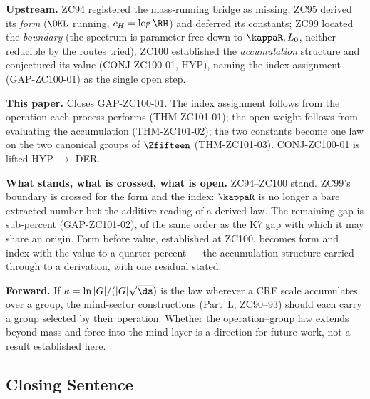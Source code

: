 \documentclass[12pt, a4paper]{article}
\begin{document}
\begin{genealogybox}[title={How ZC101 Sits in the Corpus}]
\textbf{Upstream.} ZC94 registered the mass-running bridge as missing; ZC95
derived its \emph{form} ($\DKL$ running, $c_H=\log\RH$) and deferred its
constants; ZC99 located the \emph{boundary} (the spectrum is parameter-free down
to $\kappaR,L_0$, neither reducible by the routes tried); ZC100 established the
\emph{accumulation} structure and conjectured its value (CONJ-ZC100-01, HYP),
naming the index assignment (GAP-ZC100-01) as the single open step.

\textbf{This paper.} Closes GAP-ZC100-01. The index assignment follows from the
operation each process performs (THM-ZC101-01); the open weight follows from
evaluating the accumulation (THM-ZC101-02); the two constants become one law on
the two canonical groups of $\Zfifteen$ (THM-ZC101-03). CONJ-ZC100-01 is lifted
HYP $\to$ DER.

\textbf{What stands, what is crossed, what is open.} ZC94--ZC100 stand. ZC99's
boundary is crossed for the form and the index: $\kappaR$ is no longer a bare
extracted number but the additive reading of a derived law. The remaining gap is
sub-percent (GAP-ZC101-02), of the same order as the K7 gap with which it may
share an origin. Form before value, established at ZC100, becomes form and index
with the value to a quarter percent --- the accumulation structure carried
through to a derivation, with one residual stated.

\textbf{Forward.} If $\kappa=\ln|G|/(|G|\sqrt{\ds})$ is the law wherever a CRF
scale accumulates over a group, the mind-sector constructions (Part~L,
ZC90--93) should each carry a group selected by their operation. Whether the
operation--group law extends beyond mass and force into the mind layer is a
direction for future work, not a result established here.
\end{genealogybox}

\subsection{Closing Sentence}
\end{document}
